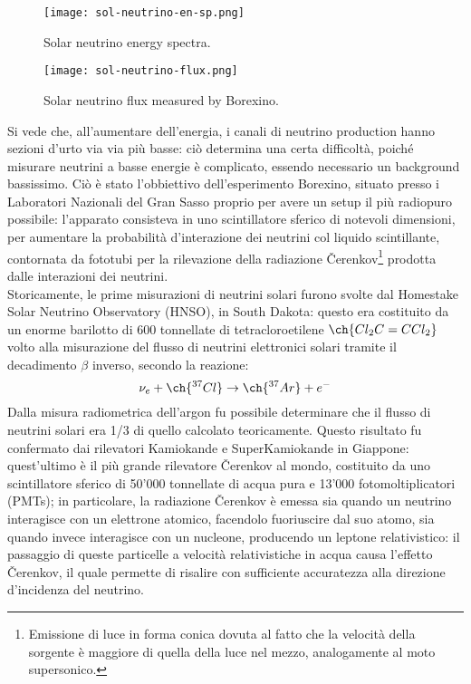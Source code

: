 \begin{figure}
	\centering
	\texttt{[image: sol-neutrino-en-sp.png]}
	\caption{Solar neutrino energy spectra.}
	\label{s-n-en-sp}
\end{figure}
\begin{figure}
	\centering
	\texttt{[image: sol-neutrino-flux.png]}
	\caption{Solar neutrino flux measured by Borexino.}
	\label{s-n-fl}
\end{figure}

Si vede che, all'aumentare dell'energia, i canali di neutrino production hanno sezioni d'urto via via più basse: ciò determina una certa difficoltà, poiché misurare neutrini a basse energie è complicato, essendo necessario un background bassissimo. Ciò è stato l'obbiettivo dell'esperimento Borexino, situato presso i Laboratori Nazionali del Gran Sasso proprio per avere un setup il più radiopuro possibile: l'apparato consisteva in uno scintillatore sferico di notevoli dimensioni, per aumentare la probabilità d'interazione dei neutrini col liquido scintillante, contornata da fototubi per la rilevazione della radiazione Čerenkov\footnote{Emissione di luce in forma conica dovuta al fatto che la velocità della sorgente è maggiore di quella della luce nel mezzo, analogamente al moto supersonico.} prodotta dalle interazioni dei neutrini.\\
Storicamente, le prime misurazioni di neutrini solari furono svolte dal Homestake Solar Neutrino Observatory (HNSO), in South Dakota: questo era costituito da un enorme barilotto di 600 tonnellate di tetracloroetilene $ \ch{Cl_2 C = C Cl_2} $ volto alla misurazione del flusso di neutrini elettronici solari tramite il decadimento $ \beta $ inverso, secondo la reazione:
\begin{equation*}
	\nu_e + \ch{^{37}Cl} \rightarrow \ch{^{37}Ar} + e^-
\end{equation*}
Dalla misura radiometrica dell'argon fu possibile determinare che il flusso di neutrini solari era 1/3 di quello calcolato teoricamente. Questo risultato fu confermato dai rilevatori Kamiokande e SuperKamiokande in Giappone: quest'ultimo è il più grande rilevatore Čerenkov al mondo, costituito da uno scintillatore sferico di 50'000 tonnellate di acqua pura e 13'000 fotomoltiplicatori (PMTs); in particolare, la radiazione Čerenkov è emessa sia quando un neutrino interagisce con un elettrone atomico, facendolo fuoriuscire dal suo atomo, sia quando invece interagisce con un nucleone, producendo un leptone relativistico: il passaggio di queste particelle a velocità relativistiche in acqua causa l'effetto Čerenkov, il quale permette di risalire con sufficiente accuratezza alla direzione d'incidenza del neutrino.

